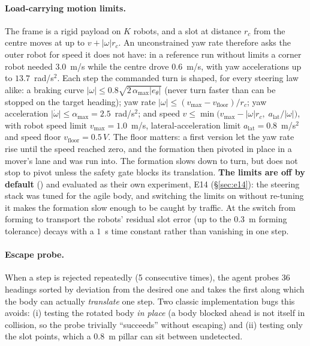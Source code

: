 \paragraph{Load-carrying motion limits.} The frame is a rigid payload on
$K$ robots, and a slot at distance $r_c$ from the centre moves at up to
$v + \lvert\omega\rvert r_c$. An unconstrained yaw rate therefore asks the
outer robot for speed it does not have: in a reference run without limits
a corner robot needed $3.0$~m/s while the centre drove $0.6$~m/s, with yaw
accelerations up to $13.7$~rad/s$^2$. Each step the commanded turn is
shaped, for every steering law alike: a braking curve
$\lvert\omega\rvert \le 0.8\sqrt{2\,\alpha_{\max}\lvert e_\theta\rvert}$
(never turn faster than can be stopped on the target heading); yaw rate
$\lvert\omega\rvert \le (v_{\max} - v_{\mathrm{floor}})/r_c$; yaw
acceleration $\lvert\dot\omega\rvert \le \alpha_{\max} = 2.5$~rad/s$^2$;
and speed $v \le \min\bigl(v_{\max} - \lvert\omega\rvert r_c,\;
a_{\mathrm{lat}}/\lvert\omega\rvert\bigr)$, with robot speed limit
$v_{\max} = 1.0$~m/s, lateral-acceleration limit
$a_{\mathrm{lat}} = 0.8$~m/s$^2$ and speed floor
$v_{\mathrm{floor}} = 0.5\,V$. The floor matters: a first version let the
yaw rate rise until the speed reached zero, and the formation then pivoted
in place in a mover's lane and was run into. The formation slows down to
turn, but does not stop to pivot unless the safety gate blocks its
translation. \textbf{The limits are off by default} () and
evaluated as their own experiment, E14 (\S\ref{sec:e14}): the steering
stack was tuned for the agile body, and switching the limits on without
re-tuning it makes the formation slow enough to be caught by traffic. At the switch from forming to transport the
robots' residual slot error (up to the $0.3$~m forming tolerance) decays
with a $1$~s time constant rather than vanishing in one step.

\paragraph{Escape probe.} When a step is rejected repeatedly (5 consecutive times), the agent probes 36
headings sorted by deviation from the desired one and takes the first along
which the body can actually \emph{translate} one step. Two classic
implementation bugs this avoids: (i) testing the rotated body \emph{in place}
(a body blocked ahead is not itself in collision, so the probe trivially
``succeeds'' without escaping) and (ii) testing only the slot points, which a
0.8~m pillar can sit between undetected.

